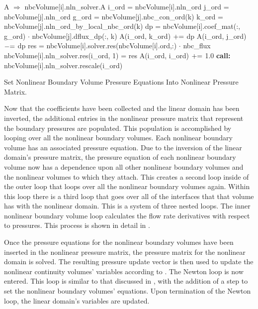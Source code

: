 \begin{algo}[ht!]
\setlength{\baselineskip}{0.625\baselineskip}
\begin{algorithmic}[1]
	\Set A $\Rightarrow$ nbcVolume[i].nln\_solver.A
	\Set i\_ord = nbcVolume[i].nln\_ord
		\Set j\_ord = nbcVolume[j].nln\_ord
			\Set g\_ord = nbcVolume[j].nbc\_con\_ord(k)
			\Set k\_ord = nbcVolume[j].nln\_ord\_by\_local\_nbc\_ord(k)
			\Set dp = nbcVolume[i].coef\_mat(:, g\_ord) $\cdot$ nbcVolume[j].dflux\_dp(:, k)
			\Set A(i\_ord, k\_ord) $\mathrel{+}=$ dp
			\Set A(i\_ord, j\_ord) $\mathrel{-}=$ dp
		\EndFor
	\EndFor
	\Set res = nbcVolume[i].solver.res(nbcVolume[i].ord,:) $\cdot$ nbc\_flux
	\Set nbcVolume[i].nln\_solver.res(i\_ord, 1) = res
	\Set A(i\_ord, i\_ord) $\mathrel{+}=$ 1.0
	\State \textbf{call:} nbcVolume[i].nln\_solver.rescale(i\_ord)
\EndFor
\end{algorithmic}
\caption{Set Nonlinear Boundary Volume Pressure Equations Into Nonlinear Pressure Matrix.}
\label{alg:domDecompSetMat}
\end{algo}

Now that the coefficients have been collected and the linear domain has been inverted, the additional entries in the nonlinear pressure matrix that represent the boundary pressures are populated.
This population is accomplished by looping over all the nonlinear boundary volumes.
Each nonlinear boundary volume has an associated pressure equation.
Due to the inversion of the linear domain's pressure matrix, the pressure equation of each nonlinear boundary volume now has a dependence upon all other nonlinear boundary volumes and the nonlinear volumes to which they attach.
This creates a second loop inside of the outer loop that loops over all the nonlinear boundary volumes again.
Within this loop there is a third loop that goes over all of the interfaces that that volume has with the nonlinear domain.
This is a system of three nested loops.
The inner nonlinear boundary volume loop calculates the flow rate derivatives with respect to pressures. 
This process is shown in detail in .

Once the pressure equations for the nonlinear boundary volumes have been inserted in the nonlinear pressure matrix, the pressure matrix for the nonlinear domain is solved.
The resulting pressure update vector is then used to update the nonlinear continuity volumes' variables according to .
The Newton loop is now entered.
This loop is similar to that discussed in , with the addition of a step to set the nonlinear boundary volumes' equations.
Upon termination of the Newton loop, the linear domain's variables are updated.

